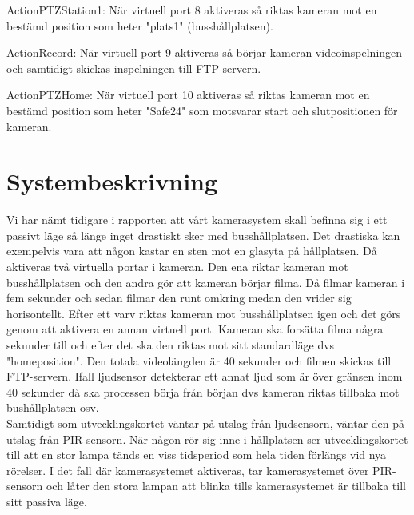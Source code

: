 ActionPTZStation1: När virtuell port 8 aktiveras så riktas kameran mot en bestämd position som  heter "plats1" (busshållplatsen).

ActionRecord: När virtuell port 9 aktiveras så börjar kameran videoinspelningen och samtidigt skickas inspelningen till FTP-servern.

ActionPTZHome: När virtuell port 10 aktiveras så riktas kameran mot en bestämd position som heter "Safe24"  som motsvarar start och slutpositionen för kameran.


 








\clearpage
\section{Systembeskrivning}
Vi har nämt tidigare i rapporten att vårt kamerasystem skall befinna sig i ett passivt läge så länge inget drastiskt sker med busshållplatsen. Det drastiska kan exempelvis vara att någon kastar en sten mot en glasyta på hållplatsen.
 Då aktiveras två virtuella portar i kameran. Den ena riktar kameran mot busshållplatsen och den andra gör att kameran börjar filma. Då filmar kameran i fem sekunder och sedan filmar den runt omkring medan den vrider sig horisontellt. Efter ett varv riktas kameran mot busshållplatsen igen och det görs genom att aktivera en annan virtuell port. Kameran ska forsätta filma några sekunder till och efter det ska den riktas mot sitt standardläge dvs "homeposition". Den totala videolängden är 40 sekunder och filmen skickas till FTP-servern. Ifall ljudsensor detekterar ett annat ljud som är över gränsen inom 40 sekunder då ska processen börja från början dvs kameran riktas tillbaka mot bushållplatsen osv.\\
 Samtidigt som utvecklingskortet väntar på utslag från ljudsensorn, väntar den på utslag från PIR-sensorn. När någon rör sig inne i hållplatsen ser utvecklingskortet till att en stor lampa tänds en viss tidsperiod som hela tiden förlängs vid nya rörelser. I det fall där kamerasystemet aktiveras, tar kamerasystemet över PIR-sensorn och låter den stora lampan att blinka tills kamerasystemet är tillbaka till sitt passiva läge.


